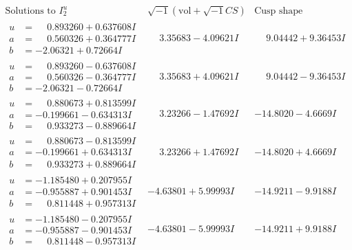 \documentclass[1p]{elsarticle_modified}
\theoremstyle{definition}
\newcommand{\I}{\sqrt{-1}}
\begin{document}
$$\begin{array}{c|c|c}  
\text{Solutions to }I^u_{2}& \I (\text{vol} + \sqrt{-1}CS) & \text{Cusp shape}\\
 \hline 
\begin{aligned}
u &= \phantom{-}0.893260 + 0.637608 I \\
a &= \phantom{-}0.560326 + 0.364777 I \\
b &= -2.06321 + 0.72664 I\end{aligned}
 & \phantom{-}3.35683 - 4.09621 I & \phantom{-}9.04442 + 9.36453 I \\ \hline\begin{aligned}
u &= \phantom{-}0.893260 - 0.637608 I \\
a &= \phantom{-}0.560326 - 0.364777 I \\
b &= -2.06321 - 0.72664 I\end{aligned}
 & \phantom{-}3.35683 + 4.09621 I & \phantom{-}9.04442 - 9.36453 I \\ \hline\begin{aligned}
u &= \phantom{-}0.880673 + 0.813599 I \\
a &= -0.199661 - 0.634313 I \\
b &= \phantom{-}0.933273 - 0.889664 I\end{aligned}
 & \phantom{-}3.23266 - 1.47692 I & -14.8020 - 4.6669 I \\ \hline\begin{aligned}
u &= \phantom{-}0.880673 - 0.813599 I \\
a &= -0.199661 + 0.634313 I \\
b &= \phantom{-}0.933273 + 0.889664 I\end{aligned}
 & \phantom{-}3.23266 + 1.47692 I & -14.8020 + 4.6669 I \\ \hline\begin{aligned}
u &= -1.185480 + 0.207955 I \\
a &= -0.955887 + 0.901453 I \\
b &= \phantom{-}0.811448 + 0.957313 I\end{aligned}
 & -4.63801 + 5.99993 I & -14.9211 - 9.9188 I \\ \hline\begin{aligned}
u &= -1.185480 - 0.207955 I \\
a &= -0.955887 - 0.901453 I \\
b &= \phantom{-}0.811448 - 0.957313 I\end{aligned}
 & -4.63801 - 5.99993 I & -14.9211 + 9.9188 I \\ \hline\begin{aligned}

\end{aligned}
\end{array}$$
\end{document}

